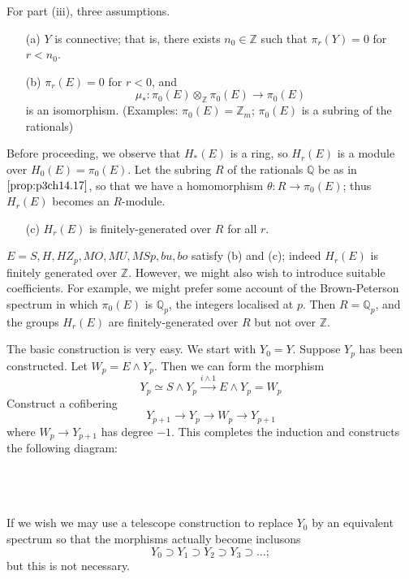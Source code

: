 \documentclass[../main]{subfiles}
\begin{document}
For part (iii), three assumptions.
\begin{enumerate}
    \item[(a)] $Y$ is connective; that is, there exists $n_0\in \mathbb{Z}$ such that $\pi_r(Y)=0$ for $r<n_0$.
    \item[(b)] $\pi_r(E)=0$ for $r<0$, and
    $$\mu_\ast:\pi_0(E)\otimes_\mathbb{Z}\pi_0(E)\longrightarrow\pi_0(E)$$
    is an isomorphism. (Examples: $\pi_0(E)=\mathbb{Z}_m$; $\pi_0(E)$ is a subring of the rationals)
\end{enumerate}

Before proceeding, we observe that $H_\ast(E)$ is a ring, so $H_r(E)$ is a module over $H_0(E)=\pi_0(E)$. Let the subring $R$ of the rationals $\mathbb{Q}$ be as in $\ref{prop:p3ch14.17}$, so that we have a homomorphism $\theta:R\longrightarrow\pi_0(E)$; thus $H_r(E)$ becomes an $R$-module.
\begin{enumerate}
    \item[(c)] $H_r(E)$ is finitely-generated over $R$ for all $r$. 
\end{enumerate}

\begin{examples}
$E=S, H, HZ_p, MO, MU, MSp, bu, bo$ satisfy (b) and (c); indeed $H_r(E)$ is finitely generated over $\mathbb{Z}$. However, we might also wish to introduce suitable coefficients. For example, we might prefer some account of the Brown-Peterson spectrum in which $\pi_0(E)$ is $\mathbb{Q}_p$, the integers localised at $p$. Then $R=\mathbb{Q}_p$, and the groups $H_r(E)$ are finitely-generated over $R$ but not over $\mathbb{Z}$.
\end{examples}

\par The basic construction is very easy. We start with $Y_0=Y$. Suppose $Y_p$ has been constructed. Let $W_p=E\wedge Y_p$. Then we can form the morphism
$$Y_p\simeq S\wedge Y_p\overset{i\wedge 1}{\longrightarrow} E\wedge Y_p=W_p$$
Construct a cofibering
$$Y_{p+1}\longrightarrow Y_p\longrightarrow W_p\longrightarrow Y_{p+1}$$
where $W_p\longrightarrow Y_{p+1}$ has degree $-1$. This completes the induction and constructs the following diagram:
~\\~\\
~\\~\\
If we wish we may use a telescope construction to replace $Y_0$ by an equivalent spectrum so that the morphisms actually become inclusons 
$$Y_0\supset Y_1 \supset Y_2 \supset Y_3\supset \hdots;$$
but this is not necessary.
\end{document}
